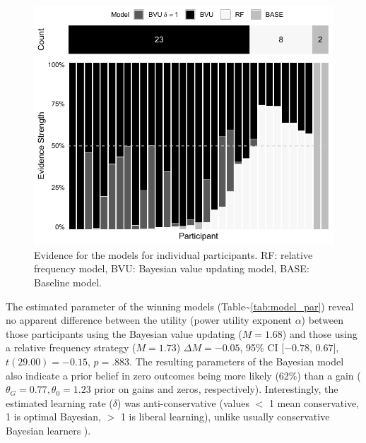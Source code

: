 \documentclass[a4paper, man, floatsintext]{apa6}
\begin{document}
\begin{figure}

{\centering \includegraphics{figures/model_weights-1} 

}

\caption{Evidence for the models for individual participants. RF: relative frequency model, BVU: Bayesian value updating model, BASE: Baseline model.}\label{fig:model_weights}
\end{figure}

The estimated parameter of the winning models
(Table\textasciitilde{}\ref{tab:model_par}) reveal no apparent
difference between the utility (power utility exponent \(\alpha\))
between those participants using the Bayesian value updating
(\(M=1.68\)) and those using a relative frequency strategy (\(M=1.73\))
\(\Delta M = -0.05\), 95\% CI \([-0.78\), \(0.67]\),
\(t(29.00) = -0.15\), \(p = .883\). The resulting parameters of the
Bayesian model also indicate a prior belief in zero outcomes being more
likely (62\%) than a gain (\(\theta_G = 0.77, \theta_0 = 1.23\) prior on
gains and zeros, respectively). Interestingly, the estimated learning
rate (\(\delta\)) was anti-conservative (values \(<\) 1 mean
conservative, 1 is optimal Bayesian, \(>\) 1 is liberal learning),
unlike usually conservative Bayesian learners
\citep{Edwards1967,Tauber2017}).
\end{document}
